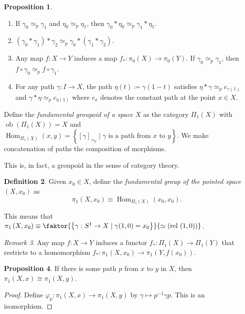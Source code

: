 \documentclass[10pt,letterpaper,cm]{nupset}
\theoremstyle{definition}
\newtheorem{definition}{Definition}[subsection]
\theoremstyle{theorem}
\newtheorem{prop}[definition]{Proposition}
\theoremstyle{remark}
\newtheorem{remark}[definition]{Remark}
\newcommand{\1}{\mathbb{1}}
\newcommand{\0}{\vec 0}
\DeclareMathOperator{\Hom}{Hom}
\DeclareMathOperator{\ob}{ob}
\DeclareMathOperator{\rel}{rel}
\begin{document}
\begin{prop} $ $
\begin{enumerate}
\item If $\gamma_0 \simeq_p \gamma_1$ and $\eta_0 \simeq_p \eta_1$, then $\gamma_0 \ast \eta_0 \simeq_p \gamma_1 \ast \eta_1$.
\item $(\gamma_0 \ast \gamma_1)\ast \gamma_2 \simeq_p \gamma_0 \ast (\gamma_1 \ast \gamma_2)$.
\item Any map $f: X \to Y$ induces a map $f_{\ast} : \pi_0(X) \to \pi_0(Y)$. If $\gamma_0 \simeq_p \gamma_1$, then $f\circ \gamma_0 \simeq_p f\circ \gamma_1$.
\item For any path $\gamma : I \to X$, the path $\eta(t) \coloneqq  \gamma(1-t)$ satisfies $\eta \ast \gamma \simeq_p c_{\gamma(1)}$ and $\gamma \ast \eta \simeq_p c_{\eta(1)}$ where $c_x$ denotes the constant path at the point $x\in X$.
\end{enumerate}
\end{prop}


\smallskip

Define the \textit{fundamental groupoid of a space $X$} as the category $\Pi_1(X)$ with $\ob(\Pi_1(X)) = X$ and $\Hom_{\Pi_1(X)}(x,y) = \left\{[\gamma]_{\simeq_p} \mid \gamma \text{ is a path from }x \text{ to }y\right\}$. We make concatenation of paths the composition of morphisms. 



This is, in fact, a groupoid in the sense of category theory.


\begin{definition}
Given $x_0 \in X$, define the \textit{fundamental group of the pointed space $\left(X, x_0\right)$} as $$\pi_1\left(X, x_0\right) \equiv \Hom_{\Pi_1(X)}(x_0,x_0) .$$ 
\end{definition}

This means that $\pi_1\left(X, x_0\right) \equiv  \faktor{\left\{\gamma : S^1 \to X \mid \gamma(1,0) =x_0\right\}}{\simeq (\rel \ (1,0))}$.

\begin{remark}
Any map $f: X \to Y$ induces a functor $f_{\ast} : \Pi_1(X) \to \Pi_1(Y)$ that restricts to a homomorphism $f_{\ast} : \pi_1\left(X, x_0\right) \to \pi_1(Y, f(x_0))$.
\end{remark}

\begin{prop}
If there is some path $p$ from $x$ to $y$ in $X$, then $\pi_1(X, x) \cong \pi_1(X, y)$.
\end{prop}
\begin{proof}
Define $\varphi_p : \pi_1(X, x) \to \pi_1(X, y)$ by $\gamma \mapsto p^{-1} \gamma p$. This is an isomorphism. 
\end{proof}
\end{document}
